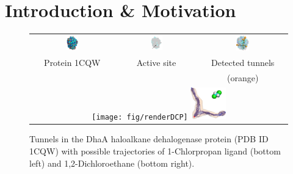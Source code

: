 \documentclass[usletter, 10pt, conference]{ieeeconf} %
\begin{document}
\section{Introduction \& Motivation}


\begin{figure}[t]
\centering
{\footnotesize
\renewcommand{\arraystretch}{0.1}
\renewcommand{\tabcolsep}{0pt}
\begin{tabular}{ccc}
\includegraphics[width=0.15\textwidth]{fig/motiv1} &
\includegraphics[width=0.17\textwidth]{fig/motiv2lab} &
\includegraphics[width=0.16\textwidth]{fig/motiv3}  \\
Protein 1CQW & Active site & Detected tunnels \\ %
             &            & (orange)         \\  %
\multicolumn{3}{c}{%
\texttt{[image: fig/renderDCP]}  \hskip 15pt
\includegraphics[width=0.14\textwidth]{fig/render37t}} \\ 
\end{tabular}
}
\caption{\label{fig::motiv}
    Tunnels in the DhaA haloalkane dehalogenase protein (PDB ID 1CQW) with possible trajectories of 1-Chlorpropan ligand (bottom left) and 1,2-Dichloroethane (bottom right).
}
\end{figure}
\end{document}
